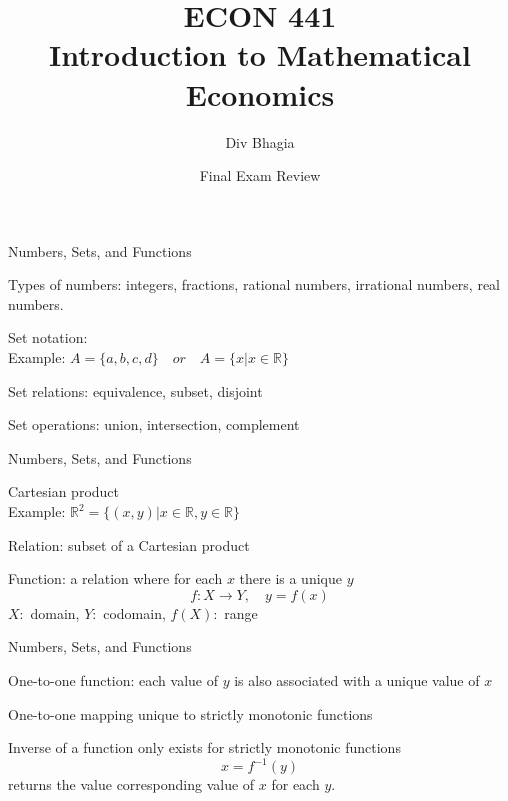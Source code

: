 \documentclass{./../../Latex/teaching_slides}
\begin{document}
\title{ECON 441 \\ \vspace{0.4em} \normalsize Introduction to Mathematical Economics}
\author{Div Bhagia}
\date{Final Exam Review}

\begin{frame}
\maketitle
\end{frame}

\begin{frame}{Numbers, Sets, and Functions}
\begin{witemize}
\item Types of numbers: integers, fractions, rational numbers, irrational numbers, real numbers.  
  \item Set notation: \\ \vspace{0.1em}
     Example: $ A = \{a, b, c, d\} \quad or \quad A = \{x | x \in  \mathbb{R}\} $
\item Set relations: equivalence, subset, disjoint
\item Set operations: union, intersection, complement
\end{witemize}
\end{frame}

\begin{frame}{Numbers, Sets, and Functions}
\begin{witemize}
\item  Cartesian product \\ \vspace{0.1em} Example: $ \mathbb{R}^2 =  \{(x,y) | x \in \mathbb{R}, y \in \mathbb{R}\} $
\item Relation: subset of a Cartesian product
\item Function: a relation where for each $x$ there is a unique $y$
 $$ f: X \rightarrow Y, \quad y = f(x) $$ 
$X:$ domain, $Y:$ codomain, $f(X):$ range
\end{witemize}
\end{frame}

\begin{frame}{Numbers, Sets, and Functions}
\begin{witemize}
 \item One-to-one function: each value of $y$ is also associated with a unique value of $x$
\item One-to-one mapping unique to strictly monotonic functions
\item Inverse of a function only exists for strictly monotonic functions $$x=f^{-1}(y)$$ returns the value corresponding value of $x$ for each $y$. 
\end{witemize}
\end{frame}
\end{document}
